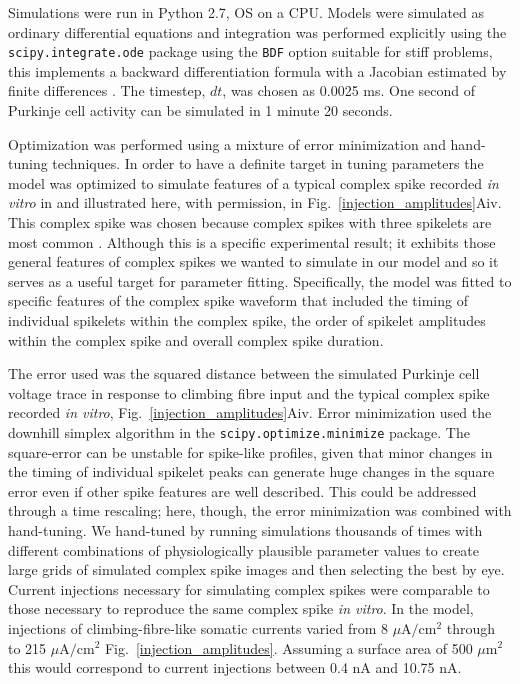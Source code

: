 \documentclass[twocolumn]{svjour3}          %
\begin{document}
Simulations were run in Python 2.7, OS on a CPU. Models were simulated
as ordinary differential equations and integration was performed
explicitly using the \texttt{scipy.integrate.ode} package using the
\texttt{BDF} option suitable for stiff problems, this implements a
backward differentiation formula with a Jacobian estimated by finite
differences \citep{ByrneHindmarsh1975}. The timestep, $dt$, was chosen
as 0.0025 ms. One second of Purkinje cell activity can be simulated in
1 minute 20 seconds.

Optimization was performed using a mixture of error minimization and
hand-tuning techniques. In order to have a definite
target in tuning parameters the model was optimized to simulate
features of a typical complex spike recorded \textit{in vitro} in
\citet{DavieEtAl2008} and illustrated here, with permission, in
Fig.~\ref{injection_amplitudes}Aiv. This complex spike was chosen
because complex spikes with three spikelets are most common
\citep{BurroughsEtAl2016}. Although this is a specific experimental
result; it exhibits those general features of complex spikes we wanted
to simulate in our model and so it serves as a useful target for
parameter fitting. Specifically, the model was fitted to specific
features of the complex spike waveform that included the timing of
individual spikelets within the complex spike, the order of spikelet
amplitudes within the complex spike and overall complex spike
duration.

The error used was the squared distance between the simulated Purkinje
cell voltage trace in response to climbing fibre input and the typical
complex spike recorded \textit{in vitro},
Fig.~\ref{injection_amplitudes}Aiv. Error minimization used the
downhill simplex algorithm in the \texttt{scipy.optimize.minimize}
package. The square-error can be unstable for spike-like profiles,
given that minor changes in the timing of individual spikelet peaks
can generate huge changes in the square error even if other spike
features are well described. This could be addressed through a time
rescaling; here, though, the error minimization was combined with
hand-tuning. We hand-tuned by running simulations thousands of times
with different combinations of physiologically plausible parameter
values to create large grids of simulated complex spike images and
then selecting the best by eye. Current injections necessary for
simulating complex spikes were comparable to those necessary to
reproduce the same complex spike \textit{in vitro}. In the model,
injections of climbing-fibre-like somatic currents varied from 8
$\mu$A$/$cm$^2$ through to 215 $\mu$A$/$cm$^2$
Fig.~\ref{injection_amplitudes}. Assuming a surface area of 500
$\mu$m$^2$ this would correspond to current injections between 0.4 nA
and 10.75 nA.
\end{document}
